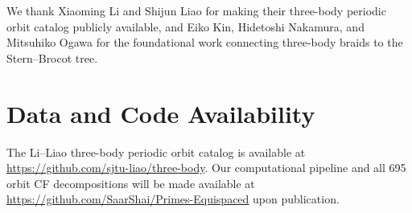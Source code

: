 \documentclass[11pt]{article}
\theoremstyle{definition}
\begin{document}
We thank Xiaoming Li and Shijun Liao for making their three-body
periodic orbit catalog publicly available, and Eiko Kin, Hidetoshi
Nakamura, and Mitsuhiko Ogawa for the foundational work connecting
three-body braids to the Stern--Brocot tree.


\section*{Data and Code Availability}

The Li--Liao three-body periodic orbit catalog is available at
\url{https://github.com/sjtu-liao/three-body}. Our computational
pipeline and all 695 orbit CF decompositions will be made available
at \url{https://github.com/SaarShai/Primes-Equispaced} upon
publication.


\end{document}
